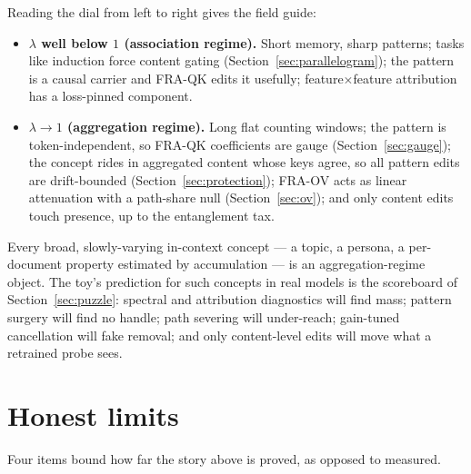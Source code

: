 \documentclass{article}
\begin{document}
Reading the dial from left to right gives the field guide:
\begin{itemize}
    \item \textbf{$\lambda$ well below $1$ (association regime).} Short memory, sharp patterns; tasks like induction force content gating (Section~\ref{sec:parallelogram}); the pattern is a causal carrier and FRA-QK edits it usefully; feature$\times$feature attribution has a loss-pinned component.
    \item \textbf{$\lambda \to 1$ (aggregation regime).} Long flat counting windows; the pattern is token-independent, so FRA-QK coefficients are gauge (Section~\ref{sec:gauge}); the concept rides in aggregated content whose keys agree, so all pattern edits are drift-bounded (Section~\ref{sec:protection}); FRA-OV acts as linear attenuation with a path-share null (Section~\ref{sec:ov}); and only content edits touch presence, up to the entanglement tax.
\end{itemize}
Every broad, slowly-varying in-context concept --- a topic, a persona, a per-document property estimated by accumulation --- is an aggregation-regime object. The toy's prediction for such concepts in real models is the scoreboard of Section~\ref{sec:puzzle}: spectral and attribution diagnostics will find mass; pattern surgery will find no handle; path severing will under-reach; gain-tuned cancellation will fake removal; and only content-level edits will move what a retrained probe sees.

\section{Honest limits}\label{sec:limits}

Four items bound how far the story above is proved, as opposed to measured.
\end{document}
